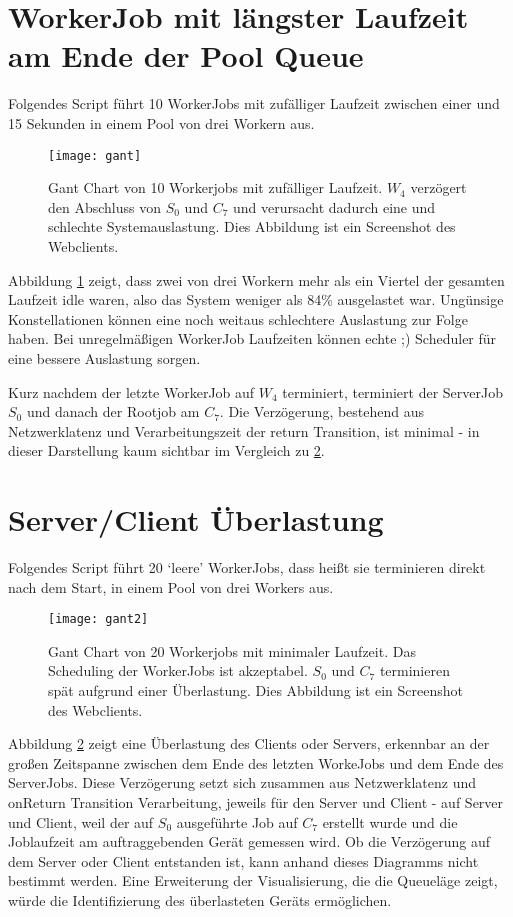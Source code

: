 \section{WorkerJob mit längster Laufzeit am Ende der Pool Queue}
\label{schedulerNeeded}
Folgendes Script führt 10 WorkerJobs mit zufälliger Laufzeit zwischen einer und 15 Sekunden in einem Pool von drei Workern aus.
\begin{figure}[H]
  \begin{center}
    \texttt{[image: gant]}
    \caption{Gant Chart von 10 Workerjobs mit zufälliger Laufzeit.
    \label{fig:gant0}
    $W_4$ verzögert den Abschluss von $S_0$ und $C_7$ und verursacht dadurch eine und schlechte Systemauslastung. Dies Abbildung ist ein Screenshot des Webclients.}
  \end{center}
\end{figure}
\noindent Abbildung \ref{fig:gant0} zeigt, dass zwei von drei Workern mehr als ein Viertel der gesamten Laufzeit idle waren, also das System weniger als 84\% ausgelastet war.
Ungünsige Konstellationen können eine noch weitaus schlechtere Auslastung zur Folge haben.
Bei unregelmäßigen WorkerJob Laufzeiten können echte ;) Scheduler für eine bessere Auslastung sorgen.

Kurz nachdem der letzte WorkerJob auf $W_4$ terminiert, terminiert der ServerJob $S_0$ und danach der Rootjob am $C_7$.
Die Verzögerung, bestehend aus Netzwerklatenz und Verarbeitungszeit der return Transition, ist minimal - in dieser Darstellung kaum sichtbar im Vergleich zu \ref{overload}.




\clearpage
\section{Server/Client Überlastung}
\label{overload}
Folgendes Script führt 20 ‘leere’ WorkerJobs, dass heißt sie terminieren direkt nach dem Start, in einem Pool von drei Workers aus.
\begin{figure}[H]
  \begin{center}
    \texttt{[image: gant2]}
    \caption{Gant Chart von 20 Workerjobs mit minimaler Laufzeit.
    \label{fig:gant2}
    Das Scheduling der WorkerJobs ist akzeptabel. $S_0$ und $C_7$ terminieren spät aufgrund einer Überlastung. Dies Abbildung ist ein Screenshot des Webclients.}
  \end{center}
\end{figure}
\noindent Abbildung \ref{fig:gant2} zeigt eine Überlastung des Clients oder Servers, erkennbar an der großen Zeitspanne zwischen dem Ende des letzten WorkeJobs und dem Ende des ServerJobs.
Diese Verzögerung setzt sich zusammen aus Netzwerklatenz und onReturn Transition Verarbeitung, jeweils für den Server und Client - auf Server und Client, weil der auf $S_0$ ausgeführte Job auf $C_7$ erstellt wurde und die Joblaufzeit am auftraggebenden Gerät gemessen wird.
Ob die Verzögerung auf dem Server oder Client entstanden ist, kann anhand dieses Diagramms nicht bestimmt werden.
Eine Erweiterung der Visualisierung, die die Queueläge zeigt, würde die Identifizierung des überlasteten Geräts ermöglichen.




